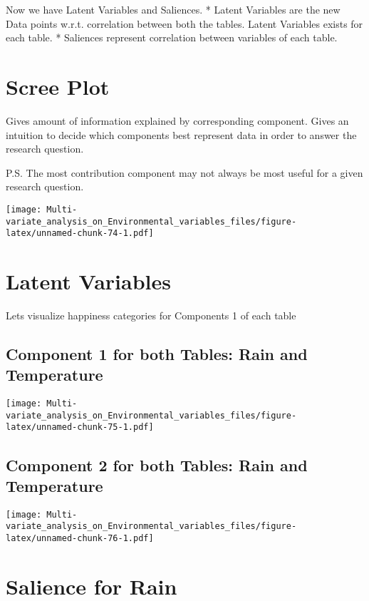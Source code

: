 \documentclass[]{book}
\begin{document}
Now we have Latent Variables and Saliences. * Latent Variables are the
new Data points w.r.t. correlation between both the tables. Latent
Variables exists for each table. * Saliences represent correlation
between variables of each table.

\hypertarget{scree-plot-4}{%
\section{Scree Plot}\label{scree-plot-4}}

Gives amount of information explained by corresponding component. Gives
an intuition to decide which components best represent data in order to
answer the research question.

P.S. The most contribution component may not always be most useful for a
given research question.

\texttt{[image: Multi-variate\_analysis\_on\_Environmental\_variables\_files/figure-latex/unnamed-chunk-74-1.pdf]}

\hypertarget{latent-variables}{%
\section{Latent Variables}\label{latent-variables}}

Lets visualize happiness categories for Components 1 of each table

\hypertarget{component-1-for-both-tables-rain-and-temperature}{%
\subsection{Component 1 for both Tables: Rain and
Temperature}\label{component-1-for-both-tables-rain-and-temperature}}

\texttt{[image: Multi-variate\_analysis\_on\_Environmental\_variables\_files/figure-latex/unnamed-chunk-75-1.pdf]}

\hypertarget{component-2-for-both-tables-rain-and-temperature}{%
\subsection{Component 2 for both Tables: Rain and
Temperature}\label{component-2-for-both-tables-rain-and-temperature}}

\texttt{[image: Multi-variate\_analysis\_on\_Environmental\_variables\_files/figure-latex/unnamed-chunk-76-1.pdf]}

\hypertarget{salience-for-rain}{%
\section{Salience for Rain}\label{salience-for-rain}}
\end{document}
